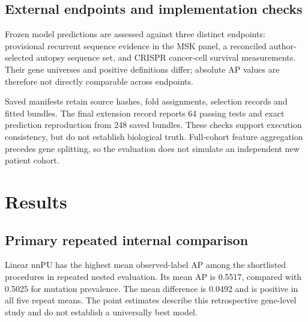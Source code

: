 \documentclass[12pt,a4paper,oneside]{report}
\begin{document}
\clearpage\section{External endpoints and implementation checks}
Frozen model predictions are assessed against three distinct endpoints: provisional recurrent sequence evidence in the MSK panel, a reconciled author-selected autopsy sequence set, and CRISPR cancer-cell survival measurements. Their gene universes and positive definitions differ; absolute AP values are therefore not directly comparable across endpoints.

Saved manifests retain source hashes, fold assignments, selection records and fitted bundles. The final extension record reports 64 passing tests and exact prediction reproduction from 248 saved bundles. These checks support execution consistency, but do not establish biological truth. Full-cohort feature aggregation precedes gene splitting, so the evaluation does not simulate an independent new patient cohort.

\chapter{Results}
\section{Primary repeated internal comparison}
Linear nnPU has the highest mean observed-label AP among the shortlisted procedures in repeated nested evaluation. Its mean AP is 0.5517, compared with 0.5025 for mutation prevalence. The mean difference is 0.0492 and is positive in all five repeat means. The point estimates describe this retrospective gene-level study and do not establish a universally best model.
\end{document}
